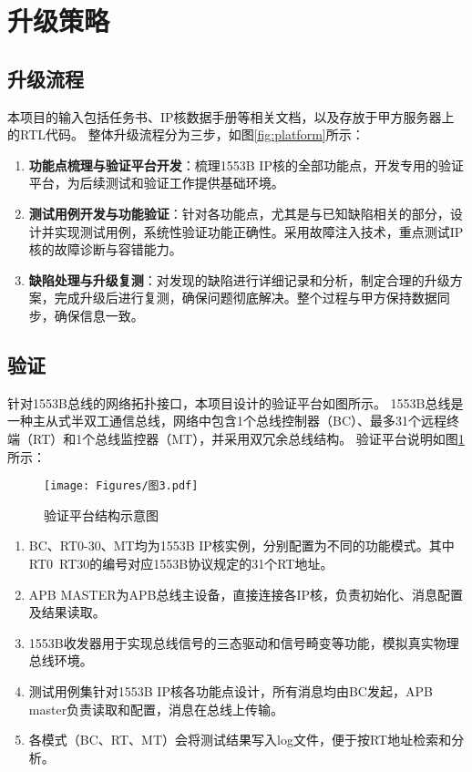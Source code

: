 \documentclass[fontset=windows]{article}
\begin{document}
\section{升级策略}
\subsection{升级流程}
本项目的输入包括任务书、IP核数据手册等相关文档，以及存放于甲方服务器上的RTL代码。
整体升级流程分为三步，如图\ref{fig:platform}所示：



\begin{enumerate}[label=(\arabic*)]
    \item \textbf{功能点梳理与验证平台开发}：梳理1553B IP核的全部功能点，开发专用的验证平台，为后续测试和验证工作提供基础环境。
    \item \textbf{测试用例开发与功能验证}：针对各功能点，尤其是与已知缺陷相关的部分，设计并实现测试用例，系统性验证功能正确性。采用故障注入技术，重点测试IP核的故障诊断与容错能力。
    \item \textbf{缺陷处理与升级复测}：对发现的缺陷进行详细记录和分析，制定合理的升级方案，完成升级后进行复测，确保问题彻底解决。整个过程与甲方保持数据同步，确保信息一致。
\end{enumerate}

\subsection{验证}

针对1553B总线的网络拓扑接口，本项目设计的验证平台如图所示。
1553B总线是一种主从式半双工通信总线，网络中包含1个总线控制器（BC）、最多31个远程终端（RT）和1个总线监控器（MT），并采用双冗余总线结构。
验证平台说明如图\ref{fig:structure}所示：

\begin{figure}[htbp]
	\centering
	\texttt{[image: Figures/图3.pdf]}
	\caption{验证平台结构示意图}
	\label{fig:structure}
\end{figure}


\begin{enumerate}[label=(\arabic*)]
    \item BC、RT0-30、MT均为1553B IP核实例，分别配置为不同的功能模式。其中RT0~RT30的编号对应1553B协议规定的31个RT地址。
    \item APB MASTER为APB总线主设备，直接连接各IP核，负责初始化、消息配置及结果读取。
    \item 1553B收发器用于实现总线信号的三态驱动和信号畸变等功能，模拟真实物理总线环境。
    \item 测试用例集针对1553B IP核各功能点设计，所有消息均由BC发起，APB master负责读取和配置，消息在总线上传输。
    \item 各模式（BC、RT、MT）会将测试结果写入log文件，便于按RT地址检索和分析。
\end{enumerate}
\end{document}
